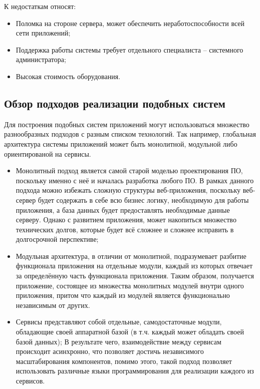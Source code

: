 К недостаткам относят:

\begin{itemize}
    \item Поломка на стороне сервера, может обеспечить неработоспособности всей сети приложений;
    \item Поддержка работы системы требует отдельного специалиста – системного администратора;
    \item Высокая стоимость оборудования.
\end{itemize}

\subsection{Обзор подходов реализации подобных систем}\label{subsec:1-analisis} \indent

Для построения подобных систем приложений могут использоваться множество разнообразных подходов с разным списком технологий.
Так например, глобальная архитектура системы приложений может быть монолитной, модульной либо ориентированой на сервисы.

\begin{itemize}
    \item Монолитный подход является самой старой моделью проектирования \hypertarget{gloss:software}{ПО}, поскольку именно с неё и началась разработка любого \hypertarget{gloss:software}{ПО}. 
    В рамках данного подхода можно избежать сложную структуры веб-приложения, поскольку веб-сервер будет содержать в себе всю бизнес логику, необходимую для работы приложения, а база данных будет предоставлять необходимые данные серверу. 
    Однако с развитием приложения, может накопиться множество технических долгов, которые будет всё сложнее и сложнее исправить в долгосрочной перспективе;
    \item Модульная архитектура, в отличии от монолитной, подразумевает разбитие функционала приложения на отдельные модули, каждый из которых отвечает за определённую часть функционала приложения.
    Таким образом, получается приложение, состоящее из множества монолитных модулей внутри одного приложения, притом что каждый из модулей является функционально независимым от других.
    \item Сервисы представляют собой отдельные, самодостаточные модули, обладающие своей аппаратной базой (в т.ч. каждый может обладать своей базой данных);
    В результате чего, взаимодействие между сервисам происходит асинхронно, что позволяет достичь независимого масштабирования компонентов, помимо этого, такой подход позволяет использовать различные языки программирования для реализации каждого из сервисов.       
\end{itemize}


